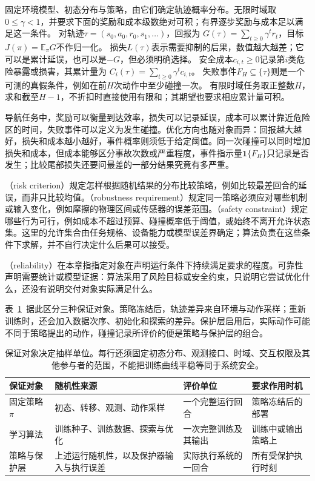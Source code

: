 \begin{definition}[回报、损失、成本与失败事件]
  \label{def:rl-trustworthy-objects}
  固定环境模型、初态分布与策略，由它们确定轨迹概率分布。无限时域取$0\leq\gamma<1$，并要求下面的奖励和成本级数绝对可积；有界逐步奖励与成本足以满足这一条件。
  对轨迹$\tau=(s_0,a_0,r_0,s_1,\ldots)$，回报为
  $G(\tau)=\sum_{t\geq0}\gamma^t r_t$，目标$J(\pi)=\mathbb E_\pi G$不作归一化。
  损失$L(\tau)$表示需要抑制的后果，数值越大越差；它可以是累计延误，也可以是$-G$，但必须明确选择。
  安全成本$c_{i,t}\geq0$记录第$i$类危险暴露或损害，其累计量为
  $C_i(\tau)=\sum_{t\geq0}\gamma^t c_{i,t}$。
  失败事件$F_H\subseteq\{\tau\}$则是一个可测的真假条件，例如在前$H$次动作中至少碰撞一次。
  有限时域任务取正整数$H$，求和截至$H-1$，不折扣时直接使用有限和；其期望也要求相应累计量可积。
\end{definition}

导航任务中，奖励可以衡量到达效率，损失可以记录延误，成本可以累计靠近危险区的时间，失败事件可以定义为发生碰撞。优化方向也随对象而异：回报越大越好，损失和成本越小越好，事件概率则须低于给定阈值。同一次碰撞可以同时增加损失和成本，但成本能够区分事故次数或严重程度，事件指示量$\mathbf 1\{F_H\}$只记录是否发生；比较尾部损失还要问最差的一部分结果究竟有多严重。

（risk criterion）规定怎样根据随机结果的分布比较策略，例如比较最差回合的延误，而非只比较均值。（robustness requirement）规定同一策略必须应对哪些机制或输入变化，例如摩擦的物理区间或传感器的误差范围。（safety constraint）规定哪些行为可行，例如成本不超过预算、碰撞概率低于阈值，或始终不离开允许状态集。这里的允许集合由任务规格、设备能力或模型误差界确定；算法负责在这些条件下求解，并不自行决定什么后果可以接受。

（reliability）在本章指指定对象在声明运行条件下持续满足要求的程度。可靠性声明需要统计或模型证据：算法采用了风险目标或安全约束，只说明它尝试优化什么，还没有说明交付对象实际满足什么。

表~\ref{tab:rl-trustworthy-guarantee-objects}~据此区分三种保证对象。策略冻结后，轨迹差异来自环境与动作采样；重新训练时，还会加入数据次序、初始化和探索的差异。保护层启用后，实际动作可能不同于策略提出的动作，碰撞记录所评价的便是策略与保护层的组合。

\begin{table}[htbp]
  \centering
  \begin{tabularx}{\linewidth}{@{}>{\raggedright\arraybackslash}p{20mm}XXX@{}}
    \toprule
    保证对象 & 随机性来源 & 评价单位 & 要求作用时机 \\
    \midrule
    固定策略$\pi$ & 初态、转移、观测、动作采样 & 一个完整运行回合 & 策略冻结后的部署 \\
    学习算法 & 训练种子、训练数据、探索与优化 & 一次完整训练及其输出 & 训练中或输出策略上 \\
    策略与保护层 & 上述运行随机性，以及保护器输入与执行误差 & 实际执行系统的一回合 & 所有受保护执行时刻 \\
    \bottomrule
  \end{tabularx}
  \caption{保证对象决定抽样单位。每行还须固定初态分布、观测接口、时域、交互权限及其他参与者的范围，不能把训练曲线平稳等同于系统安全。}
  \label{tab:rl-trustworthy-guarantee-objects}
\end{table}

